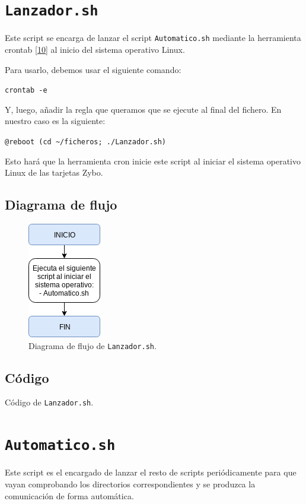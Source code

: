 \section{\texttt{Lanzador.sh}}
\hypertarget{ScriptLanzador}{}
Este script se encarga de lanzar el script \texttt{Automatico.sh} mediante la herramienta crontab \hyperlink{10}{[10]} al inicio del sistema operativo Linux.

Para usarlo, debemos usar el siguiente comando:
\begin{center}
	\texttt{crontab -e}
\end{center}

Y, luego, añadir la regla que queramos que se ejecute al final del fichero. En nuestro caso es la siguiente:
\begin{center}
	\texttt{@reboot (cd \textasciitilde/ficheros; ./Lanzador.sh)}
\end{center}

Esto hará que la herramienta cron inicie este script al iniciar el sistema operativo Linux de las tarjetas Zybo.

\newpage
\subsection{Diagrama de flujo}
\begin{figure}[h]
	\centering
	\includegraphics[scale=0.9]{Anexos/Anexo3/Diagramas/Lanzador.png}
	\caption{Diagrama de flujo de \texttt{Lanzador.sh}.}
	\label{Diagrama de flujo de Lanzador.sh}
\end{figure}

\subsection{Código}

\begin{center}
	Código de \texttt{Lanzador.sh}.
\end{center}


\newpage
\section{\texttt{Automatico.sh}}
\hypertarget{ScriptAutomatico}{}
Este script es el encargado de lanzar el resto de scripts periódicamente para que vayan comprobando los directorios correspondientes y se produzca la comunicación de forma automática.

